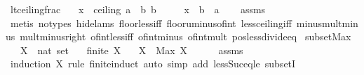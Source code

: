 \begin{isabellebody}
\isadelimproof
\isanewline
%
\endisadelimproof
\isanewline
{}\isamarkupfalse%
\ lt{\isacharunderscore}ceiling{\isacharunderscore}frac{\isacharcolon}\isanewline
\ \ \ {\isachardoublequoteopen}x\ {\isacharless}\ ceiling\ {\isacharparenleft}a\ {\isacharslash}\ b{\isacharparenright}{\isachardoublequoteclose}\ {\isachardoublequoteopen}b\ {\isachargreater}\ {}{\isachardoublequoteclose}\isanewline
\ \ \ {\isachardoublequoteopen}x\ {\isacharasterisk}\ b\ {\isacharless}\ a{\isachardoublequoteclose}\isanewline
%
\isadelimproof
\ \ %
\endisadelimproof
%
\isatagproof
{}\isamarkupfalse%
\ assms\isanewline
\ \ \isamarkupfalse%
\ {\isacharparenleft}metis\ {\isacharparenleft}no{\isacharunderscore}types{\isacharcomma}\ hide{\isacharunderscore}lams{\isacharparenright}\ floor{\isacharunderscore}less{\isacharunderscore}iff\ floor{\isacharunderscore}uminus{\isacharunderscore}of{\isacharunderscore}int\ less{\isacharunderscore}ceiling{\isacharunderscore}iff\ minus{\isacharunderscore}mult{\isacharunderscore}minus\ mult{\isacharunderscore}minus{\isacharunderscore}right\ of{\isacharunderscore}int{\isacharunderscore}{}{\isacharunderscore}less{\isacharunderscore}iff\ of{\isacharunderscore}int{\isacharunderscore}minus\ of{\isacharunderscore}int{\isacharunderscore}mult\ pos{\isacharunderscore}less{\isacharunderscore}divide{\isacharunderscore}eq{\isacharparenright}%
\endisatagproof
{\isafoldproof}%
%
\isadelimproof
\isanewline
%
\endisadelimproof
\isanewline
{}\isamarkupfalse%
\ subset{\isacharunderscore}Max{\isacharcolon}\isanewline
\ \ \ X\ {\isacharcolon}{\isacharcolon}\ {\isachardoublequoteopen}nat\ set{\isachardoublequoteclose}\isanewline
\ \ \ {\isachardoublequoteopen}finite\ X{\isachardoublequoteclose}\isanewline
\ \ \ {\isachardoublequoteopen}X\ {\isasymsubseteq}\ {\isacharbraceleft}{}{\isachardot}{\isachardot}{\isacharless}Max\ X\ {\isacharplus}\ {}{\isacharbraceright}{\isachardoublequoteclose}\isanewline
%
\isadelimproof
\ \ %
\endisadelimproof
%
\isatagproof
{}\isamarkupfalse%
\ assms\isanewline
\ \ \isamarkupfalse%
\ {\isacharparenleft}induction\ X\ rule{\isacharcolon}\ finite{\isachardot}induct{\isacharparenright}\ {\isacharparenleft}auto\ simp\ add{\isacharcolon}\ less{\isacharunderscore}Suc{\isacharunderscore}eq{\isacharunderscore}le\ subsetI{\isacharparenright}%
\endisatagproof
{\isafoldproof}%
%
\isadelimproof
\isanewline
%
\endisadelimproof

\end{isabellebody}
